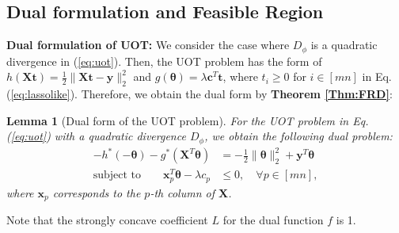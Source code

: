 \documentclass[twoside]{article}
\theoremstyle{plain}
\newtheorem{lem}[thm]{Lemma}
\newcommand{\mat}[1]{\mathbf{#1}}
\renewcommand{\vec}[1]{\bm{#1}}
\begin{document}
\subsection{Dual formulation and Feasible Region}

{\bf Dual formulation of UOT:} We consider the case where $D_\phi$ is a quadratic divergence in (\ref{eq:uot}). Then, the UOT problem has the form of
$h(\mat{X} \vec{t}) = \frac{1}{2}\|\mat{X} \vec{t}-\vec{y}\|_2^2$ and $g(\vec{\theta})=\lambda \vec{c}^{T}\vec{t}$, where $t_i \geq 0$ for $i \in [mn]$ in Eq.(\ref{eq:lassolike}). Therefore, we obtain the dual form by {\bf Theorem \ref{Thm:FRD}}:
%
\begin{lem}[Dual form of the UOT problem]
For the UOT problem in Eq.(\ref{eq:uot}) with a quadratic divergence $D_\phi$, we obtain the following dual problem:
\begin{equation}
\begin{split}
-h^*(-\vec{\theta}) - g^*(\mat{X}^T\vec{\theta})& = -\frac{1}{2}\|\vec{\theta}\|_2^2+\vec{y}^T\vec{\theta} \\
\text{subject\ to} \quad \quad \vec{x}_p^T\vec{\theta} -\lambda c_p &\leq 0, \quad \forall p \in [mn],
\end{split}
\label{eq:uotdual}
\end{equation}
where $\vec{x}_p $ corresponds to the $p$-th column of $\mat{X}$.
\end{lem}
%
Note that the strongly concave coefficient $L$ for the dual function $f$ is 1. 
\end{document}
